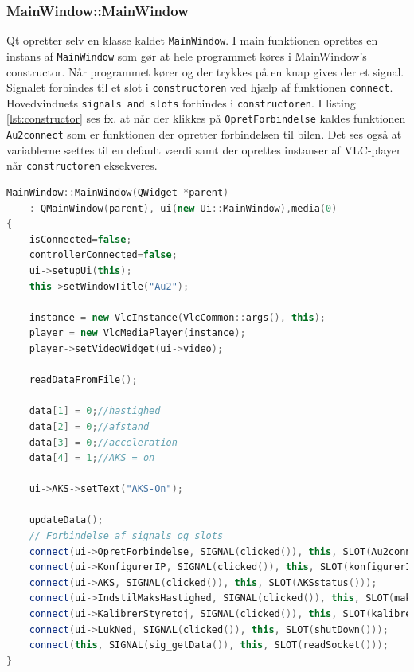 \subsubsection{MainWindow::MainWindow}
Qt opretter selv en klasse kaldet \texttt{MainWindow}. I main funktionen oprettes en instans af \texttt{MainWindow} som gør at hele programmet køres i MainWindow's constructor. Når programmet kører og der trykkes på en knap gives der et signal. Signalet forbindes til et slot i \texttt{constructoren} ved hjælp af funktionen \texttt{connect}. Hovedvinduets \texttt{signals and slots} forbindes i \texttt{constructoren}. I listing \ref{lst:constructor} ses fx. at når der klikkes på \texttt{OpretForbindelse} kaldes funktionen \texttt{Au2connect} som er funktionen der opretter forbindelsen til bilen. Det ses også at variablerne sættes til en default værdi samt der oprettes instanser af VLC-player når \texttt{constructoren} eksekveres. 
\begin{lstlisting}[caption={MainWindows constructor},label=lst:constructor, language=c++]
MainWindow::MainWindow(QWidget *parent)
    : QMainWindow(parent), ui(new Ui::MainWindow),media(0)
{
    isConnected=false;
    controllerConnected=false;
    ui->setupUi(this);
    this->setWindowTitle("Au2");

    instance = new VlcInstance(VlcCommon::args(), this);
    player = new VlcMediaPlayer(instance);
    player->setVideoWidget(ui->video);

    readDataFromFile();

    data[1] = 0;//hastighed
    data[2] = 0;//afstand
    data[3] = 0;//acceleration
    data[4] = 1;//AKS = on

    ui->AKS->setText("AKS-On");

    updateData();
    // Forbindelse af signals og slots 
    connect(ui->OpretForbindelse, SIGNAL(clicked()), this, SLOT(Au2connect()));
    connect(ui->KonfigurerIP, SIGNAL(clicked()), this, SLOT(konfigurerIP()));
    connect(ui->AKS, SIGNAL(clicked()), this, SLOT(AKSstatus()));
    connect(ui->IndstilMaksHastighed, SIGNAL(clicked()), this, SLOT(maksHastighed()));
    connect(ui->KalibrerStyretoj, SIGNAL(clicked()), this, SLOT(kalibrerStyretoj()));
    connect(ui->LukNed, SIGNAL(clicked()), this, SLOT(shutDown()));
    connect(this, SIGNAL(sig_getData()), this, SLOT(readSocket()));
}
\end{lstlisting}
